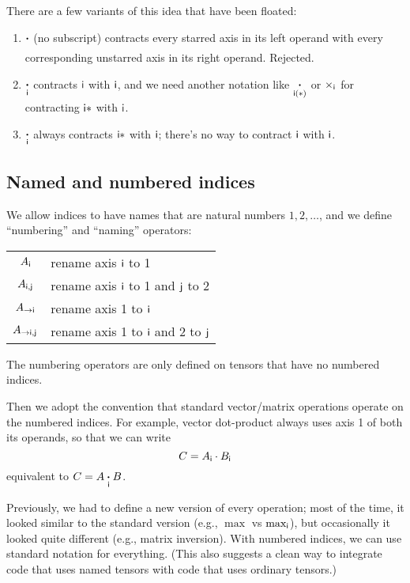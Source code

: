 \documentclass{article}
\begin{document}
There are a few variants of this idea that have been floated:
\begin{enumerate}
\item $\mathbin{\mathop{\boldsymbol\cdot}\limits_{\mathsf{}}}$ (no subscript) contracts every starred axis in its left operand with every corresponding unstarred axis in its right operand. Rejected.
\item $\mathbin{\mathop{\boldsymbol\cdot}\limits_{\mathsf{i}}}$ contracts $\mathsf{i}$ with $\mathsf{i}$, and we need another notation like $\mathbin{\mathop{\boldsymbol\cdot}\limits_{\mathsf{i(*)}}}$ or $\mathop\times\displaylimits_{\mathsf{i}}$ for contracting $\mathsf{i*}$ with $\mathsf{i}$.
\item $\mathbin{\mathop{\boldsymbol\cdot}\limits_{\mathsf{i}}}$ always contracts $\mathsf{i*}$ with $\mathsf{i}$; there's no way to contract $\mathsf{i}$ with $\mathsf{i}$.
\end{enumerate}

\subsection{Named and numbered indices}
\label{sec:tensorsoftensors}

We allow indices to have names that are natural numbers $1, 2, \ldots$, and we define ``numbering'' and ``naming'' operators:
\begin{center}
\begin{tabular}{cl}
$A_{\mathsf{i}}$ & rename axis $\mathsf{i}$ to 1 \\
$A_{\mathsf{i},\mathsf{j}}$ & rename axis $\mathsf{i}$ to 1 and $\mathsf{j}$ to 2 \\
$A_{\rightarrow\mathsf{i}}$ & rename axis 1 to $\mathsf{i}$ \\
$A_{\rightarrow\mathsf{i},\mathsf{j}}$ & rename axis 1 to $\mathsf{i}$ and 2 to $\mathsf{j}$
\end{tabular}
\end{center}
The numbering operators are only defined on tensors that have no numbered indices.

Then we adopt the convention that standard vector/matrix operations operate on the numbered indices. For example, vector dot-product always uses axis 1 of both its operands, so that we can write
\begin{equation*}
C = A_{\mathsf{i}} \cdot B_{\mathsf{i}}
\end{equation*}
equivalent to $C = A \mathbin{\mathop{\boldsymbol\cdot}\limits_{\mathsf{i}}} B$. 

Previously, we had to define a new version of every operation; most of the time, it looked similar to the standard version (e.g., $\max$ vs $\max_{\mathsf{i}}$), but occasionally it looked quite different (e.g., matrix inversion). With numbered indices, we can use standard notation for everything.
(This also suggests a clean way to integrate code that uses named tensors with code that uses ordinary tensors.)
\end{document}

